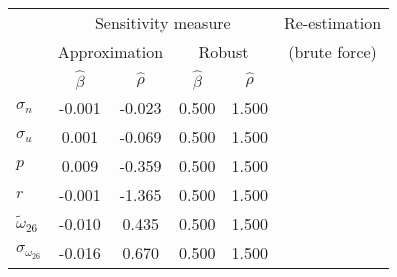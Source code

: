 \begin{tabular}{l*{6}{c}} \toprule 
& \multicolumn{4}{c}{Sensitivity measure} & \multicolumn{2}{c}{Re-estimation} \\ \cmidrule(lr){2-5} \cmidrule(lr){6-7}  
& \multicolumn{2}{c}{Approximation} & \multicolumn{2}{c}{Robust} & \multicolumn{2}{c}{(brute force)} \\ \cmidrule(lr){2-3} \cmidrule(lr){4-5} \cmidrule(lr){6-7}  
& $\hat{\beta}$ & $\hat{\rho}$ & $\hat{\beta}$ & $\hat{\rho}$ \\ \cmidrule(lr){2-5} 
  $\sigma_{n}$ & -0.001 & -0.023 & 0.500 & 1.500 \\ 
  $\sigma_{u}$ & 0.001 & -0.069 & 0.500 & 1.500 \\ 
  $p$ & 0.009 & -0.359 & 0.500 & 1.500 \\ 
  $r$ & -0.001 & -1.365 & 0.500 & 1.500 \\ 
  $\tilde{\omega}_{26}$ & -0.010 & 0.435 & 0.500 & 1.500 \\ 
  $\sigma_{\omega_{26}}$ & -0.016 & 0.670 & 0.500 & 1.500 \\ 
 \bottomrule 
 \end{tabular}